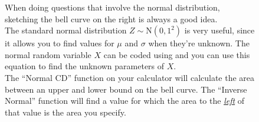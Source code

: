 \documentclass[../main.tex]{subfile}
\begin{document}
\begin{figure}[h]
\begin{center}
\begin{minipage}{0.5\linewidth}
	\setlength{\parskip}{1ex}
	When doing questions that involve the normal distribution, sketching the bell curve on the right is always a good idea.\\

	The standard normal distribution $Z \sim \text{N}(0, 1^2)$ is very useful, since it allows you to find values for $\mu$ and $\sigma$ when they're unknown. The normal random variable $X$ can be coded using  and you can use this equation to find the unknown parameters of $X$.\\

	The \enquote{Normal CD} function on your calculator will calculate the area between an upper and lower bound on the bell curve. The \enquote{Inverse Normal} function will find a value for which the area to the \underline{\textit{left}} of that value is the area you specify.
\end{minipage}\hfill
\begin{minipage}{0.48\linewidth}
\end{minipage}
\end{center}
\end{figure}
\end{document}
